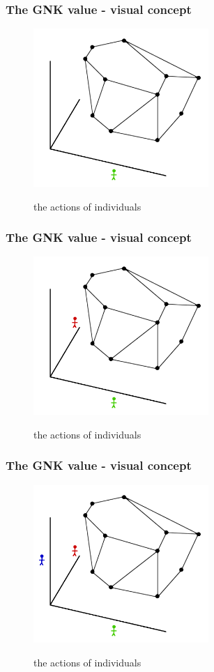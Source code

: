 \begin{frame} \frametitle{The GNK value - visual concept} \begin{figure} \begin{center} \includegraphics[height=6cm]{figs/pp3} \end{center} the actions of individuals \end{figure} \end{frame}
\begin{frame} \frametitle{The GNK value - visual concept} \begin{figure} \begin{center} \includegraphics[height=6cm]{figs/pp4} \end{center} the actions of individuals \end{figure} \end{frame}
\begin{frame} \frametitle{The GNK value - visual concept} \begin{figure} \begin{center} \includegraphics[height=6cm]{figs/pp5} \end{center} the actions of individuals \end{figure} \end{frame}
